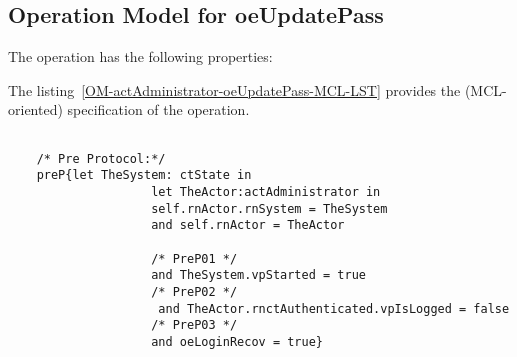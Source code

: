 \subsection{Operation Model for oeUpdatePass}

\label{OM-oeUpdatePass}


The  operation has the following properties:

	\begin{operationmodel}



		


	\end{operationmodel}



	\vspace{1cm}
	The listing~\ref{OM-actAdministrator-oeUpdatePass-MCL-LST} provides the \msrmessir (MCL-oriented) specification of the operation.
	
	\scriptsize
	\vspace{0.5cm}
	\begin{lstlisting}[style=MessirStyle,firstnumber=auto,captionpos=b,caption={\msrmessir (MCL-oriented) specification of the operation \emph{oeUpdatePass}.},label=OM-actAdministrator-oeUpdatePass-MCL-LST]

	/* Pre Protocol:*/ 
	preP{let TheSystem: ctState in
					let TheActor:actAdministrator in
					self.rnActor.rnSystem = TheSystem
	 				and self.rnActor = TheActor
	 				
	 				/* PreP01 */
	  				and TheSystem.vpStarted = true
					/* PreP02 */
	 				 and TheActor.rnctAuthenticated.vpIsLogged = false
	  				/* PreP03 */
	  				and oeLoginRecov = true}
	
	
	
	
	\end{lstlisting}
	\normalsize 
	
	
	
	





